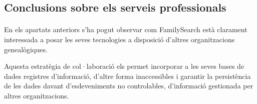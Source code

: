     \subsection{Conclusions sobre els serveis professionals}

    \paragraph{}
    En els apartats anteriors s'ha pogut observar com FamilySearch està clarament interessada a posar les seves tecnologies a disposició d'altres organitzacions genealògiques.

    Aquesta estratègia de col·laboració els permet incorporar a les seves bases de dades registres d'informació, d'altre forma inaccessibles i garantir la persistència de les dades davant d'esdeveniments no controlables, d'informació gestionada per altres organitzacions.
